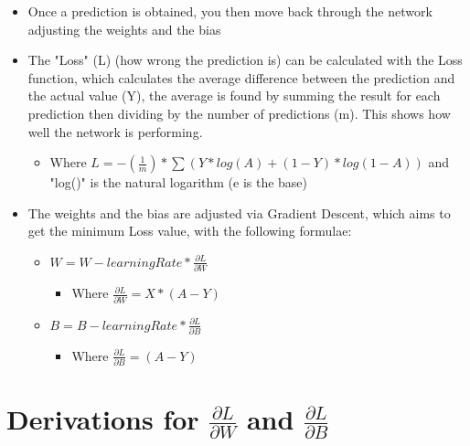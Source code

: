 \documentclass[10pt,a4paper]{article}
\begin{document}
\begin{itemize}
    \item Once a prediction is obtained, you then move back through the network adjusting the weights and the bias
    \item The "Loss" (L) (how wrong the prediction is) can be calculated with the Loss function, which calculates the average difference between the prediction and the actual value (Y), the average is found by summing the result for each prediction then dividing by the number of predictions (m). This shows how well the network is performing.
    \begin{itemize}
        \item Where $L = -(\frac{1}{m}) * \sum(Y * log(A) + (1-Y) * log(1-A))$ and "log()" is the natural logarithm (e is the base)
    \end{itemize}
    \item The weights and the bias are adjusted via Gradient Descent, which aims to get the minimum Loss value, with the following formulae:
    \begin{itemize}
        \item $W = W - learningRate * \frac{\partial{L}}{\partial{W}}$
        \begin{itemize}
            \item Where $\frac{\partial{L}}{\partial{W}} = X * (A-Y)$
        \end{itemize}
        \item $B = B - learningRate * \frac{\partial{L}}{\partial{B}}$
        \begin{itemize}
            \item Where $\frac{\partial{L}}{\partial{B}} = (A-Y)$
        \end{itemize}
    \end{itemize}
\end{itemize}

\section{Derivations for $\frac{\partial{L}}{\partial{W}}$ and $\frac{\partial{L}}{\partial{B}}$}
\end{document}
